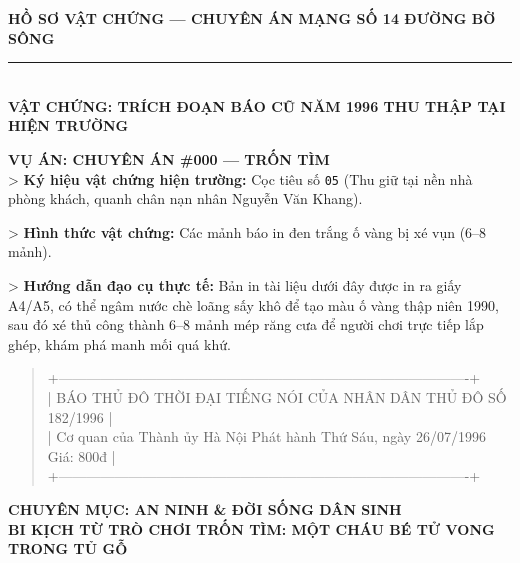\documentclass[12pt,a4paper]{article}
\begin{document}
\begin{center}
    \fontsize{11pt}{13pt}\selectfont
    \textbf{HỒ SƠ VẬT CHỨNG — CHUYÊN ÁN MẠNG SỐ 14 ĐƯỜNG BỜ SÔNG}\\[-0.2em]
    \rule{6cm}{0.6pt}\\[0.5cm]
    \textbf{\Large  VẬT CHỨNG: TRÍCH ĐOẠN BÁO CŨ NĂM 1996 THU THẬP TẠI HIỆN TRƯỜNG}\\[0.15cm]
    \textit{}
\end{center}
\vspace{0.3cm}

\vspace{0.35cm}\noindent\textbf{\large VỤ ÁN: CHUYÊN ÁN \#000 — TRỐN TÌM}\\[0.15cm]


> \textbf{Ký hiệu vật chứng hiện trường:} Cọc tiêu số \texttt{05} (Thu giữ tại nền nhà phòng khách, quanh chân nạn nhân Nguyễn Văn Khang).

> \textbf{Hình thức vật chứng:} Các mảnh báo in đen trắng ố vàng bị xé vụn (6–8 mảnh).

> \textbf{Hướng dẫn đạo cụ thực tế:} Bản in tài liệu dưới đây được in ra giấy A4/A5, có thể ngâm nước chè loãng sấy khô để tạo màu ố vàng thập niên 1990, sau đó xé thủ công thành 6–8 mảnh mép răng cưa để người chơi trực tiếp lắp ghép, khám phá manh mối quá khứ.




\begin{quote}
\fontsize{9pt}{11pt}\selectfont\ttfamily
+----------------------------------------------------------------------------------------+\\
| BÁO THỦ ĐÔ THỜI ĐẠI               TIẾNG NÓI CỦA NHÂN DÂN THỦ ĐÔ             SỐ 182/1996 |\\
| Cơ quan của Thành ủy Hà Nội       Phát hành Thứ Sáu, ngày 26/07/1996        Giá: 800đ  |\\
+----------------------------------------------------------------------------------------+\\
\end{quote}



\vspace{0.3cm}\noindent\textbf{\large CHUYÊN MỤC: AN NINH \& ĐỜI SỐNG DÂN SINH}\\[0.15cm]



\vspace{0.35cm}\noindent\textbf{\large \textbf{BI KỊCH TỪ TRÒ CHƠI TRỐN TÌM: MỘT CHÁU BÉ TỬ VONG TRONG TỦ GỖ}}\\[0.15cm]
\end{document}
